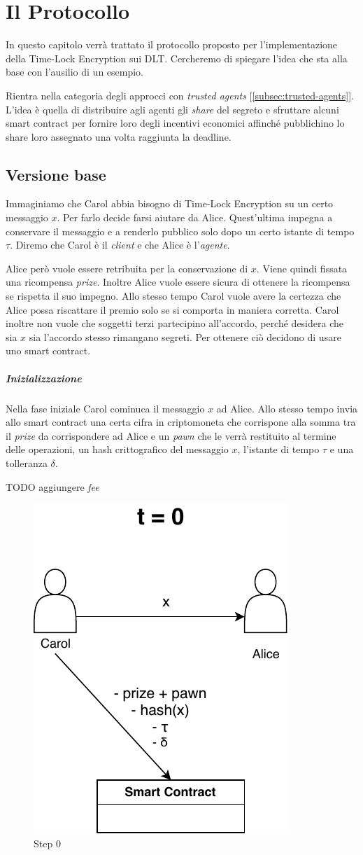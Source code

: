 \chapter{Il Protocollo}
\label{chap:protocollo}

In questo capitolo verrà trattato il protocollo proposto per l'implementazione
della Time-Lock Encryption sui DLT.
Cercheremo di spiegare
l'idea che sta alla base con l'ausilio di un esempio.

Rientra nella categoria degli approcci
con \textit{trusted agents} [\ref{subsec:trusted-agents}].
L'idea è quella di distribuire agli agenti gli \textit{share} del segreto
e sfruttare alcuni smart contract per
fornire loro degli incentivi economici affinché pubblichino lo share 
loro assegnato una volta raggiunta la deadline.
\section{Versione base}
\label{sec:versione-base}
Immaginiamo che Carol abbia bisogno di Time-Lock Encryption su un certo messaggio $ x $.
Per farlo decide farsi aiutare da Alice. Quest'ultima
impegna a conservare il messaggio e a renderlo pubblico solo dopo un
certo istante di tempo $ \tau $.
Diremo che Carol è il \textit{client} e che Alice è l'\textit{agente}.

Alice però vuole essere retribuita per la conservazione di $ x $. Viene quindi fissata
una ricompensa \textit{prize}. Inoltre Alice vuole essere sicura di
ottenere la ricompensa se rispetta il suo impegno. Allo stesso tempo Carol
vuole avere la certezza che Alice possa riscattare il premio solo se si comporta
in maniera corretta.
Carol inoltre non vuole che soggetti terzi partecipino all'accordo, perché desidera
che sia $ x $ sia l'accordo stesso rimangano segreti.
Per ottenere ciò decidono di usare uno smart contract.

\paragraph{Inizializzazione}
Nella fase iniziale Carol cominuca il messaggio $ x $ ad Alice. Allo stesso tempo invia
allo smart contract una certa cifra in criptomoneta
che corrispone alla somma tra il \textit{prize} da corrispondere ad Alice e un
\textit{pawn} che le verrà restituito al termine delle operazioni, un hash
crittografico del messaggio $ x $, l'istante di tempo $ \tau $ e una tolleranza $ \delta $.

TODO aggiungere \textit{fee}
\begin{figure}[H]
	\centering
	\includegraphics[width=0.3\linewidth]{images/chap_protocollo/base-creazione.pdf}
	\caption{Step 0}
\end{figure}


